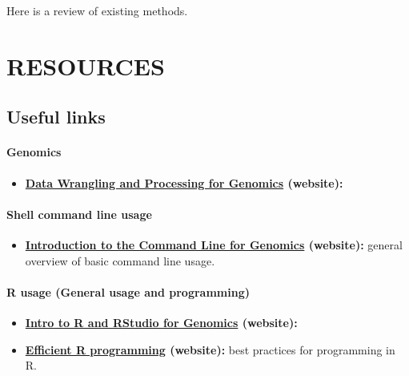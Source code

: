 \documentclass[
]{book}
\providecommand{\tightlist}{%
  \setlength{\itemsep}{0pt}\setlength{\parskip}{0pt}}
\begin{document}
Here is a review of existing methods.

\hypertarget{part-resources}{%
\part{RESOURCES}\label{part-resources}}

\hypertarget{useful-links}{%
\chapter{Useful links}\label{useful-links}}

\hypertarget{genomics}{%
\subsection*{Genomics}\label{genomics}}

\begin{itemize}
\tightlist
\item
  \textbf{\href{https://datacarpentry.org/wrangling-genomics/}{Data Wrangling and Processing for Genomics} (website):}
\end{itemize}

\hypertarget{shell-command-line-usage}{%
\subsection*{Shell command line usage}\label{shell-command-line-usage}}

\begin{itemize}
\tightlist
\item
  \textbf{\href{https://datacarpentry.org/shell-genomics/}{Introduction to the Command Line for Genomics} (website):} general overview of basic command line usage.
\end{itemize}

\hypertarget{r-usage-general-usage-and-programming}{%
\subsection*{R usage (General usage and programming)}\label{r-usage-general-usage-and-programming}}

\begin{itemize}
\tightlist
\item
  \textbf{\href{https://datacarpentry.org/genomics-r-intro/}{Intro to R and RStudio for Genomics} (website):}
\item
  \textbf{\href{https://csgillespie.github.io/efficientR/index.html}{Efficient R programming} (website):} best practices for programming in R.
\end{itemize}
\end{document}
